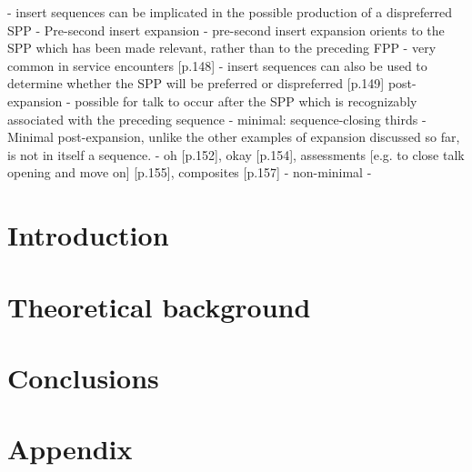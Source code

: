 \documentclass[11pt]{article}
\begin{document}
  - insert sequences can be implicated in the possible production of a dispreferred SPP
- Pre-second insert expansion
  - pre-second insert expansion orients to the SPP which has been made relevant, rather than to the preceding FPP
  - very common in service encounters [p.148]
  - insert sequences can also be used to determine whether the SPP will be preferred or dispreferred [p.149]
post-expansion
- possible for talk to occur after the SPP which is recognizably associated with the preceding sequence
- minimal: sequence-closing thirds 
  - Minimal post-expansion, unlike the other examples of expansion discussed so far, is not in itself a sequence.
  - oh [p.152], okay [p.154], assessments [e.g. to close talk opening and move on] [p.155], composites [p.157]
- non-minimal
  - 



\section{Introduction}{
}

\section{Theoretical background}{
}

\section{Conclusions}{
}




\section*{Appendix}{

}
\end{document}
